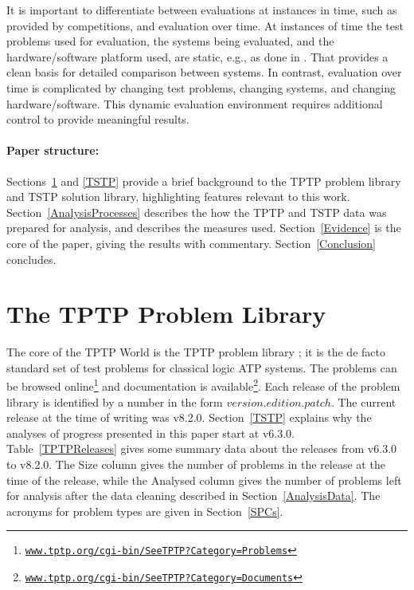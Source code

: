 \documentclass[runningheads]{llncs}
\begin{document}
It is important to differentiate between evaluations at instances in time, such as provided by
competitions, and evaluation over time.
At instances of time the test problems used for evaluation, the systems being evaluated, and
the hardware/software platform used, are static, e.g., as done in \cite{CSW15}.
That provides a clean basis for detailed comparison between systems.
In contrast, evaluation over time is complicated by changing test problems, changing systems,
and changing hardware/software.
This dynamic evaluation environment requires additional control to provide meaningful results.

\paragraph{Paper structure:}
Sections~\ref{TPTP} and \ref{TSTP} provide a brief background to the TPTP problem library and
TSTP solution library, highlighting features relevant to this work.
Section~\ref{AnalysisProcesses} describes the how the TPTP and TSTP data was prepared for
analysis, and describes the measures used.
Section~\ref{Evidence} is the core of the paper, giving the results with commentary.
Section~\ref{Conclusion} concludes.

\section{The TPTP Problem Library}
\label{TPTP}

The core of the TPTP World is the TPTP problem library \cite{Sut09}; it is the de facto standard 
set of test problems for classical logic ATP systems.
The problems can be browsed online\footnote{%
\href{https://www.tptp.org/cgi-bin/SeeTPTP?Category=Problems}
{\tt www.tptp.org/cgi-bin/SeeTPTP?Category=Problems}}
and documentation is available\footnote{%
\href{https://www.tptp.org/cgi-bin/SeeTPTP?Category=Documents}
{\tt www.tptp.org/cgi-bin/SeeTPTP?Category=Documents}}.
Each release of the problem library is identified by a number in the form 
$version$.$edition$.$patch$.
The current release at the time of writing was v8.2.0.
Section~\ref{TSTP} explains why the analyses of progress presented in this paper start at v6.3.0.
Table~\ref{TPTPReleases} gives some summary data about the releases from v6.3.0 to v8.2.0.
The Size column gives the number of problems in the release at the time of the release, while
the Analysed column gives the number of problems left for analysis after the data cleaning 
described in Section~\ref{AnalysisData}.
The acronyms for problem types are given in Section~\ref{SPCs}.
\end{document}
